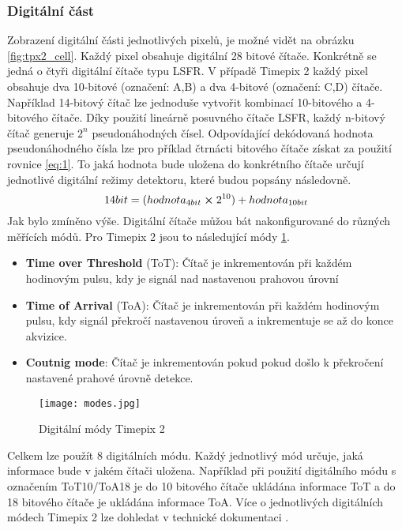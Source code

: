 \subsubsection{Digitální část}
\label{Digitálni cast}
Zobrazení digitální části jednotlivých pixelů, je možné vidět na obrázku \ref{fig:tpx2_cell}. Každý pixel obsahuje digitální 28 bitové čítače. Konkrétně se jedná o čtyři digitální čítače typu LSFR. V případě Timepix 2 každý pixel obsahuje dva 10-bitové (označení: A,B) a dva 4-bitové (označení: C,D) čítače. Například 14-bitový čítač lze jednoduše vytvořit kombinací 10-bitového a 4-bitového čítače. Díky použití lineárně posuvného čítače LSFR, každý n-bitový čítač generuje $2^n$ pseudonáhodných čísel. Odpovídající dekódovaná hodnota pseudonáhodného čísla lze pro příklad čtrnácti bitového čítače získat za použití rovnice \ref{eq:1}. To jaká hodnota bude uložena do konkrétního čítače určují jednotlivé digitální režimy detektoru, které budou popsány následovně.
\begin{equation}
	14bit = (hodnota_{4bit} \cross 2^{10}) + hodnota_{10bit}
	\label{eq:1}
\end{equation}
Jak bylo zmíněno výše. Digitální čítače můžou bát nakonfigurované do různých měřících módů. Pro Timepix 2 jsou to následující módy \ref{fig:modes}. 
\begin{itemize}
	\item \textbf{Time over Threshold} (ToT): Čítač je inkrementován při každém hodinovým pulsu, kdy je signál nad nastavenou prahovou úrovní
	\item \textbf{Time of Arrival} (ToA): Čítač je inkrementován při každém hodinovým pulsu, kdy signál překročí nastavenou úroveň a inkrementuje se až do konce akvizice.
	\item \textbf{Coutnig mode}: Čítač je inkrementován pokud pokud došlo k překročení nastavené prahové úrovně detekce.
\end{itemize}
\begin{figure}[h!]
	\centering
	\captionsetup{justification=centering}
	\texttt{[image: modes.jpg]}
	\caption{Digitální módy Timepix 2 \cite{Manek}} 
	\label{fig:modes}
\end{figure}	
\par Celkem lze použít 8 digitálních módu. Každý jednotlivý mód určuje, jaká informace bude v jakém čítači uložena. Například při použití digitálního módu s označením ToT10/ToA18  je do 10 bitového čítače ukládána informace ToT a do 18 bitového čítače je ukládána informace ToA. Více o jednotlivých digitálních módech Timepix 2 lze dohledat v technické dokumentaci \cite{tpx2_manual}.


